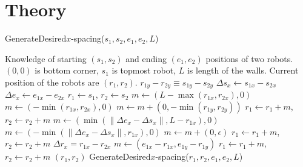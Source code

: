\section{Theory}
\label{sec:theory}

\begin{algorithm}
\caption{GenerateDesired$x$-spacing($s_1,s_2,e_1,e_2,L$)}\label{alg:XControl}
\begin{algorithmic}[1]
\Require Knowledge of starting $(s_1,s_2)$ and ending $(e_1,e_2)$ positions of  two robots. 
$(0,0)$ is bottom corner, $s_1$ is topmost robot, 
 $L$ is length of the walls. Current position of the robots are $(r_1,r_2)$.
\Ensure   $ r_{1y} - r_{2y}  \equiv s_{1y} - s_{2y} $   %
\State $ \Delta s_x  \gets s_{1x} - s_{2x} $
\State $ \Delta e_x \gets e_{1x} - e_{2x} $
\State $ r_1 \gets s_1$, $ r_2 \gets s_2$
\State $ m \gets ( L-\max( r_{1x},r_{2x}) ,0)   $ 
\Else 
\State  $ m \gets ( -\min( r_{1x},r_{2x}),0 )    $ 
\EndIf
\State $m  \gets  m + (0, -\min( r_{1y},r_{2y} ))$ 
\State $ r_1 \gets r_1+m$, $ r_2 \gets r_2+m$ 
\State $ m \gets (\min(\|\Delta e_x - \Delta s_x \|, L- r_{1x}), 0)$  
\Else
\State $ m \gets (-\min(\|\Delta e_x - \Delta s_x \|, r_{1x}), 0)$
\EndIf 
\State $m  \gets  m + (0, \epsilon)$ 
\State $ r_1 \gets r_1+m$, $ r_2 \gets r_2+m$ 
\State $\Delta r_x = r_{1x} - r_{2x}$
\State   $ m \gets (e_{1x}-r_{1x}, e_{1y}-r_{1y})$
\State $ r_1 \gets r_1+m$, $ r_2 \gets r_2+m$ 
\State  \Return $(r_1,r_2)$
\Else   
\State \Return GenerateDesired$x$-spacing($r_1,r_2,e_1,e_2,L$)
\EndIf
\end{algorithmic}
\end{algorithm}

